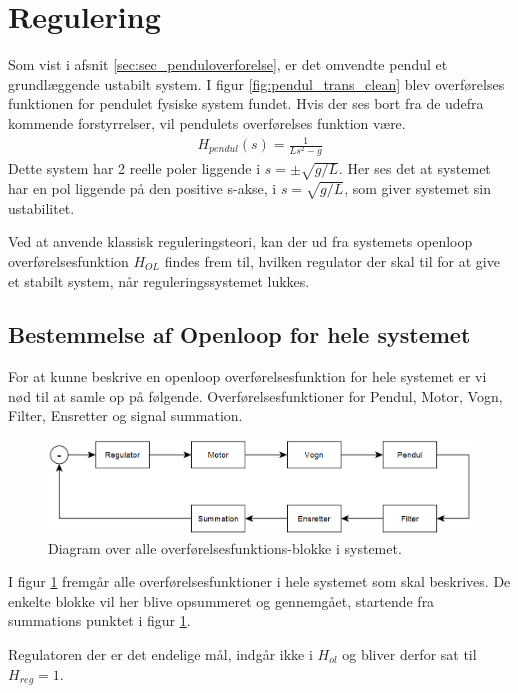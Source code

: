 \section{Regulering}\label{sec:regulering}

Som vist i afsnit \ref{sec:sec_penduloverforelse}, er det omvendte pendul et grundlæggende ustabilt system.
I figur \ref{fig:pendul_trans_clean} blev overførelses funktionen for pendulet fysiske system fundet.
Hvis der ses bort fra de udefra kommende forstyrrelser, vil pendulets overførelses funktion være.
\begin{align}
H_{pendul}(s) = \frac{1}{Ls^2 - g} \label{eq:h_pendul}
\end{align} 
Dette system har 2 reelle poler liggende i $s = \pm\sqrt{g/L}$.
Her ses det at systemet har en pol liggende på den positive s-akse, i $s = \sqrt{g/L}$, som giver systemet sin ustabilitet.

Ved at anvende klassisk reguleringsteori, kan der ud fra systemets openloop overførelsesfunktion $H_{OL}$ findes frem til, hvilken regulator der skal til for at give et stabilt system, når reguleringssystemet lukkes.   

\subsection{Bestemmelse af Openloop for hele systemet}
For at kunne beskrive en openloop overførelsesfunktion for hele systemet er vi nød til at samle op på følgende.
Overførelsesfunktioner for Pendul, Motor, Vogn, Filter, Ensretter og signal summation.
\begin{figure}[h!]
	\centering
	\includegraphics[width=.8\textwidth]{billeder/reg_diagram.png}
	\caption{Diagram over alle overførelsesfunktions-blokke i systemet.}
	\label{fig:reg_diagram}
\end{figure}
\FloatBlock 

I figur \ref{fig:reg_diagram} fremgår alle overførelsesfunktioner i hele systemet som skal beskrives.
De enkelte blokke vil her blive opsummeret og gennemgået, startende fra summations punktet i figur \ref{fig:reg_diagram}.

Regulatoren der er det endelige mål, indgår ikke i $H_{ol}$ og bliver derfor sat til $H_{reg} = 1$.   

